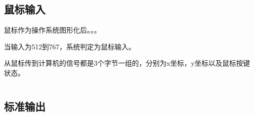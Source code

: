 \newpage
\subsection{鼠标输入}

鼠标作为操作系统图形化后。。。

当输入为512到767，系统判定为鼠标输入。

从鼠标传到计算机的信号都是3个字节一组的，分别为x坐标，y坐标以及鼠标按键状态。
\begin{listing}[H]
  \inputminted[tabsize=2, firstline=247, lastline=247,
  linenos=true]{c}{../ZOS/src/kernel/bootpack.c}
\end{listing}

\newpage
\subsection{标准输出}